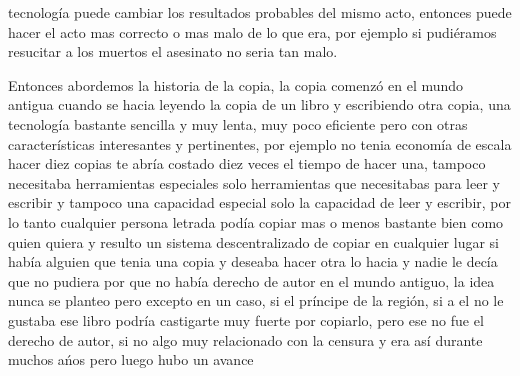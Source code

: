 \begin{multicols}{2}
tecnología puede cambiar los resultados probables del mismo acto, entonces puede hacer el acto mas correcto o mas malo de lo que era, por ejemplo si pudiéramos resucitar a los muertos el asesinato no seria tan malo.


Entonces abordemos la historia de la copia, la copia comenzó en el mundo antigua cuando se hacia leyendo la copia de un libro y escribiendo otra copia, una tecnología bastante sencilla y muy lenta, muy poco eficiente pero con otras características interesantes y pertinentes, por ejemplo no tenia economía de escala hacer diez copias te abría costado diez veces el tiempo de hacer una, tampoco necesitaba herramientas especiales solo herramientas que necesitabas para leer y escribir y tampoco una capacidad especial solo la capacidad de leer y escribir, por lo tanto cualquier persona letrada podía copiar mas o menos bastante bien como quien quiera y resulto un sistema descentralizado de copiar en cualquier lugar si había alguien que tenia  una copia y deseaba hacer otra lo hacia y nadie le decía que no pudiera por que no había derecho de autor en el mundo antiguo, la idea nunca se planteo pero excepto en un caso, si el príncipe de la región, si a el no le gustaba ese libro podría castigarte muy fuerte por copiarlo, pero ese no fue el derecho de autor, si no algo muy relacionado con la censura y era así durante muchos ańos  pero luego hubo un avance 



\end{multicols}
